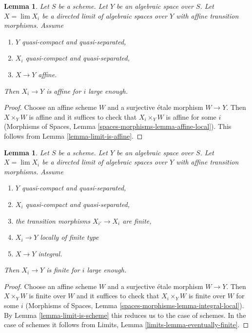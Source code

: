 \documentclass{stacks-project}
\theoremstyle{plain}
\newtheorem{lemma}[subsection]{Lemma}
\theoremstyle{definition}
\theoremstyle{remark}
\numberwithin{equation}{subsection}
\def\lim{\mathop{\mathrm{lim}}\nolimits}
\begin{document}
\begin{lemma}
\label{lemma-eventually-affine}
Let $S$ be a scheme. Let $Y$ be an algebraic space over $S$.
Let $X = \lim X_i$ be a directed limit of algebraic spaces over $Y$
with affine transition morphisms. Assume
\begin{enumerate}
\item $Y$ quasi-compact and quasi-separated,
\item $X_i$ quasi-compact and quasi-separated,
\item $X \to Y$ affine.
\end{enumerate}
Then $X_i \to Y$ is affine for $i$ large enough.
\end{lemma}

\begin{proof}
Choose an affine scheme $W$ and a surjective \'etale morphism $W \to Y$.
Then $X \times_Y W$ is affine and it suffices to check that
$X_i \times_Y W$ is affine for some $i$ (Morphisms of Spaces,
Lemma \ref{spaces-morphisms-lemma-affine-local}).
This follows from Lemma \ref{lemma-limit-is-affine}.
\end{proof}

\begin{lemma}
\label{lemma-eventually-finite}
Let $S$ be a scheme. Let $Y$ be an algebraic space over $S$.
Let $X = \lim X_i$ be a directed limit of algebraic spaces
over $Y$ with affine transition morphisms. Assume
\begin{enumerate}
\item $Y$ quasi-compact and quasi-separated,
\item $X_i$ quasi-compact and quasi-separated,
\item the transition morphisms $X_{i'} \to X_i$ are finite,
\item $X_i \to Y$ locally of finite type
\item $X \to Y$ integral.
\end{enumerate}
Then $X_i \to Y$ is finite for $i$ large enough.
\end{lemma}

\begin{proof}
Choose an affine scheme $W$ and a surjective \'etale morphism $W \to Y$.
Then $X \times_Y W$ is finite over $W$ and it suffices to check that
$X_i \times_Y W$ is finite over $W$ for some $i$ (Morphisms of Spaces,
Lemma \ref{spaces-morphisms-lemma-integral-local}). By
Lemma \ref{lemma-limit-is-scheme} this reduces us to the case of schemes.
In the case of schemes it follows from
Limits, Lemma \ref{limits-lemma-eventually-finite}.
\end{proof}
\end{document}
